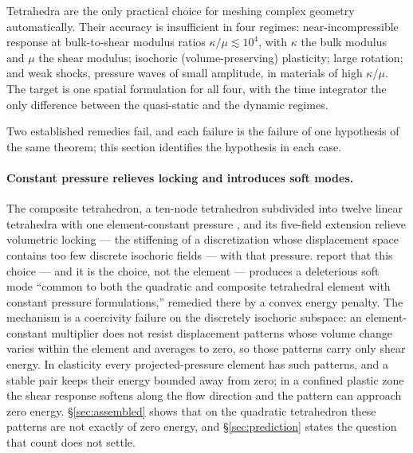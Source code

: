 \documentclass[11pt]{article}
\theoremstyle{definition}
\theoremstyle{plain}
\begin{document}
Tetrahedra are the only practical choice for meshing complex geometry
automatically. Their accuracy is insufficient in four regimes: near-incompressible
response at bulk-to-shear modulus ratios $\kappa/\mu \lesssim 10^4$, with
$\kappa$ the bulk modulus and $\mu$ the shear modulus; isochoric
(volume-preserving) plasticity; large rotation; and weak shocks, pressure
waves of small amplitude, in materials of high $\kappa/\mu$. The target is
one spatial formulation for all four, with the time integrator the only
difference between the quasi-static and the dynamic regimes.

Two established remedies fail, and each failure is the failure of one
hypothesis of the same theorem; this section identifies the hypothesis in
each case.

\paragraph{Constant pressure relieves locking and introduces soft modes.}
The composite tetrahedron, a ten-node tetrahedron subdivided into twelve
linear tetrahedra with one element-constant pressure
\citep{Thoutireddy.etal:2002, Ostien.etal:2016}, and its five-field extension
\citep{Foulk.etal:2021} relieve volumetric locking --- the stiffening of a
discretization whose displacement space contains too few discrete isochoric
fields --- with that pressure. \citet{Foulk.etal:2021} report that this
choice --- and it is the choice, not the element --- produces a deleterious
soft mode ``common to both the quadratic and composite tetrahedral element with
constant pressure formulations,'' remedied there by a convex energy penalty.
The mechanism is a coercivity failure on the discretely isochoric subspace: an
element-constant multiplier does not resist displacement patterns whose volume
change varies within the element and averages to zero, so those patterns carry
only shear energy. In elasticity every projected-pressure element has such
patterns, and a stable pair keeps their energy bounded away from zero; in a
confined plastic zone the shear response softens along the flow direction and
the pattern can approach zero energy. \S\ref{sec:assembled} shows that on the
quadratic tetrahedron these patterns are not exactly of zero energy, and
\S\ref{sec:prediction} states the question that count does not settle.
\end{document}
